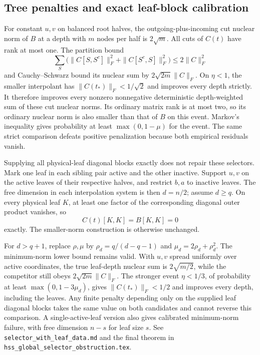 \documentclass[11pt,oneside,openany,a4paper]{book}
\numberwithin{equation}{chapter}
\theoremstyle{definition}
\theoremstyle{remark}
\newcommand{\sourcefile}[1]{{\small\nolinkurl{#1}}}
\begin{document}
\subsection{Tree penalties and exact leaf-block calibration}

For constant $u,v$ on balanced root halves, the outgoing-plus-incoming
cut nuclear norm of $B$ at a depth with $m$ nodes per half is $2\sqrt m$.
All cuts of $C(t)$ have rank at most one.  The partition bound
\[
 \sum_S\bigl(\|C[S,S^c]\|_F^2+
                    \|C[S^c,S]\|_F^2\bigr)\le2\|C\|_F^2
\]
and Cauchy--Schwarz bound its nuclear sum by
$2\sqrt{2m}\|C\|_F$.  On $\eta<1$, the smaller interpolant has
$\|C(t_*)\|_F<1/\sqrt2$ and improves every depth strictly.  It therefore
improves every nonzero nonnegative deterministic depth-weighted sum of
these cut nuclear norms.  Its ordinary matrix rank is at most two, so
its ordinary nuclear norm is also smaller than that of $B$ on this
event.  Markov's inequality gives probability at least
$\max(0,1-\mu)$ for the event.  The same strict comparison defeats
positive penalization because both empirical residuals vanish.

Supplying all physical-leaf diagonal blocks exactly does not repair
these selectors.  Mark one leaf in each sibling pair active and the
other inactive.  Support $u,v$ on the active leaves of their respective
halves, and restrict $b,a$ to inactive leaves.  The free dimension in
each interpolation system is then $d=n/2$; assume $d\ge q$.  On every
physical leaf $K$, at least one factor of the corresponding diagonal
outer product vanishes, so
\[
 C(t)[K,K]=B[K,K]=0
\]
exactly.  The smaller-norm construction is otherwise unchanged.

For $d>q+1$, replace $\rho,\mu$ by
$\rho_d=q/(d-q-1)$ and $\mu_d=2\rho_d+\rho_d^2$.  The minimum-norm
lower bound remains valid.  With $u,v$ spread uniformly over active
coordinates, the true leaf-depth nuclear sum is $2\sqrt{m/2}$, while
the competitor still obeys $2\sqrt{2m}\|C\|_F$.  The stronger event
$\eta<1/3$, of probability at least $\max(0,1-3\mu_d)$, gives
$\|C(t_*)\|_F<1/2$ and improves every depth, including the leaves.
Any finite penalty depending only on the supplied leaf diagonal blocks
takes the same value on both candidates and cannot reverse this
comparison.  A single-active-leaf version also gives calibrated
minimum-norm failure, with free dimension $n-s$ for leaf size $s$.
See \sourcefile{selector_with_leaf_data.md} and the final theorem in
\sourcefile{hss_global_selector_obstruction.tex}.
\end{document}
